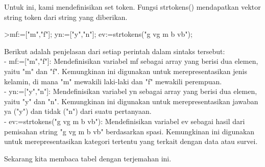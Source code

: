\documentclass[a4paper,10pt]{article}
\begin{document}
\begin{eulernotebook}
\begin{eulercomment}
\begin{eulercomment}
\begin{eulercomment}
\begin{eulercomment}
\begin{eulercomment}
\begin{eulercomment}
\begin{eulercomment}
\begin{eulercomment}
\begin{eulercomment}
\begin{eulercomment}
\begin{eulercomment}
\begin{eulercomment}
\begin{eulercomment}
\begin{eulercomment}
\begin{eulercomment}
\begin{eulercomment}
\begin{eulercomment}
\begin{eulercomment}
\begin{eulercomment}
Untuk ini, kami mendefinisikan set token. Fungsi strtokens()
mendapatkan vektor string token dari string yang diberikan.
\end{eulercomment}
\begin{eulerprompt}
>mf:=["m","f"]; yn:=["y","n"]; ev:=strtokens("g vg m b vb");
\end{eulerprompt}
\begin{eulercomment}
Berikut adalah penjelasan dari setiap perintah dalam sintaks tersebut:\\
- mf:=["m","f"]: Mendefinisikan variabel mf sebagai array yang berisi
dua elemen, yaitu "m" dan "f". Kemungkinan ini digunakan untuk
merepresentasikan jenis kelamin, di mana "m" mewakili laki-laki dan
"f" mewakili perempuan.\\
- yn:=["y","n"]: Mendefinisikan variabel yn sebagai array yang berisi
dua elemen, yaitu "y" dan "n". Kemungkinan ini digunakan untuk
merepresentasikan jawaban ya ("y") dan tidak ("n") dari suatu
pertanyaan.\\
- ev:=strtokens("g vg m b vb"): Mendefinisikan variabel ev sebagai
hasil dari pemisahan string "g vg m b vb" berdasarkan spasi.
Kemungkinan ini digunakan untuk merepresentasikan kategori tertentu
yang terkait dengan data atau survei.

Sekarang kita membaca tabel dengan terjemahan ini.


\end{eulercomment}
\end{eulercomment}
\end{eulercomment}
\end{eulercomment}
\end{eulercomment}
\end{eulercomment}
\end{eulercomment}
\end{eulercomment}
\end{eulercomment}
\end{eulercomment}
\end{eulercomment}
\end{eulercomment}
\end{eulercomment}
\end{eulercomment}
\end{eulercomment}
\end{eulercomment}
\end{eulercomment}
\end{eulercomment}
\end{eulercomment}
\end{eulernotebook}
\end{document}
